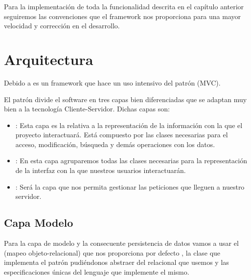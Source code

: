
Para la implementación de toda la funcionalidad descrita en el capítulo anterior
seguiremos las convenciones que el framework  nos
proporciona para una mayor velocidad y corrección en el desarrollo.

\section{Arquitectura}

\label{pattern:mvc}
Debido a  es un framework que hace un uso intensivo del
patrón  (MVC).

El patrón  divide el software en tres capas
bien diferenciadas que se adaptan muy bien a la tecnología
Cliente-Servidor. Dichas capas son:

\begin{itemize}
\item {}: Esta capa es la relativa a la representación de la
  información con la que el proyecto interactuará. Está compuesto por las clases
  necesarias para el acceso, modificación, búsqueda y demás operaciones con los
  datos.
\item {}: En esta capa agruparemos todas las clases necesarias para
  la representación de la interfaz con la que nuestros usuarios interactuarán.
\item {}: Será la capa que nos permita gestionar las
  peticiones que lleguen a nuestro servidor.
\end{itemize}

\subsection{Capa Modelo}

Para la capa de modelo y la consecuente persistencia de datos vamos a usar el
 (mapeo objeto-relacional) que nos proporciona por defecto
, la clase  que implementa el
patrón  pudiéndonos abstraer del 
relacional que usemos y las especificaciones únicas del lenguaje 
que implemente el mismo.

